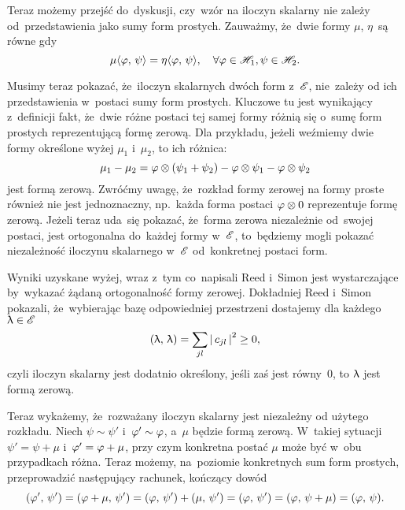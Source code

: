 \documentclass[a4paper,11pt]{article}
\begin{document}
Teraz możemy przejść do~dyskusji, czy~wzór na iloczyn skalarny nie
zależy od~przedstawienia jako sumy form prostych. Zauważmy, że~dwie
formy $\mu$, $\eta$~są równe gdy
\begin{equation*}
  \mu\langle  \varphi , \,  \psi  \rangle = \eta\langle  \varphi , \,  \psi  \rangle,
  \quad \forall \varphi \in \mathcal{H}_{ 1 }, \psi \in \mathcal{H}_{ 2 }.
\end{equation*}

Musimy teraz pokazać, że~iloczyn skalarnych dwóch form z~$\mathcal{E}$,
nie~zależy od ich przedstawienia w~postaci sumy form prostych.
Kluczowe tu jest wynikający z~definicji fakt, że~dwie różne postaci
tej samej formy różnią się o~sumę form prostych reprezentującą formę
zerową. Dla przykładu, jeżeli weźmiemy dwie formy określone wyżej
$\mu_{ 1 }$ i~$\mu_{ 2 }$, to ich różnica:
\begin{equation*}
  \mu_{ 1 } - \mu_{ 2 } = \varphi \otimes ( \psi_{ 1 } + \psi_{ 2 } )
  - \varphi \otimes \psi_{ 1 } - \varphi \otimes \psi_{ 2 }
\end{equation*}
jest formą zerową. Zwróćmy uwagę, że~rozkład formy zerowej na formy
proste również nie jest jednoznaczny, np.~każda forma postaci
$\varphi \otimes 0$ reprezentuje formę zerową. Jeżeli teraz uda~się pokazać,
że~forma zerowa niezależnie od~swojej postaci, jest ortogonalna
do~każdej formy w~$\mathcal{E}$, to~będziemy mogli pokazać niezależność
iloczynu skalarnego w~$\mathcal{E}$ od~konkretnej postaci form.

Wyniki uzyskane wyżej, wraz z~tym co~napisali Reed i~Simon jest
wystarczające by~wykazać żądaną ortogonalność formy zerowej.
Dokładniej Reed i~Simon pokazali, że~wybierając bazę odpowiedniej
przestrzeni dostajemy dla każdego $\uplambda \in \mathcal{E}$
\begin{equation*}
  ( \uplambda, \, \uplambda ) = \sum\limits_{ j l } \left| \,  c_{ j l }  \, \right|^{ 2 } \geq 0,
\end{equation*}
czyli iloczyn skalarny jest dodatnio określony, jeśli zaś jest
równy~0, to $\uplambda$ jest formą zerową.

Teraz wykażemy, że~rozważany iloczyn skalarny jest niezależny od
użytego rozkładu. Niech $\psi \sim \psi'$ i~$\varphi' \sim \varphi$, a~$\mu$
będzie formą zerową. W~takiej sytuacji $\psi' = \psi + \mu$
i~$\varphi' = \varphi + \mu$, przy czym konkretna postać $\mu$ może być w~obu
przypadkach różna. Teraz możemy, na~poziomie konkretnych sum form
prostych, przeprowadzić następujący rachunek, kończący dowód
\begin{equation*}
  (  \varphi' , \,  \psi'  ) = (  \varphi + \mu , \,  \psi'  )
  = (  \varphi , \,  \psi'  ) + (  \mu , \,  \psi'  ) = (  \varphi , \,  \psi'  )
  = (  \varphi , \,  \psi + \mu  ) = (  \varphi , \,  \psi  ).
\end{equation*}
\end{document}
